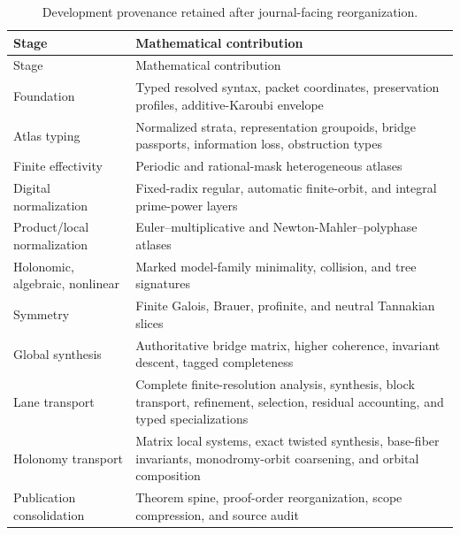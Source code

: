 \begin{longtable}{@{}L{0.27\textwidth}L{0.65\textwidth}@{}}
\caption{Development provenance retained after journal-facing reorganization.}\label{tab:block14-development-ledger}\\
\toprule
Stage & Mathematical contribution \\
\midrule
\endfirsthead
\toprule
Stage & Mathematical contribution \\
\midrule
\endhead
Foundation & Typed resolved syntax, packet coordinates, preservation profiles, additive-Karoubi envelope \\
Atlas typing & Normalized strata, representation groupoids, bridge passports, information loss, obstruction types \\
Finite effectivity & Periodic and rational-mask heterogeneous atlases \\
Digital normalization & Fixed-radix regular, automatic finite-orbit, and integral prime-power layers \\
Product/local normalization & Euler--multiplicative and Newton-Mahler--polyphase atlases \\
Holonomic, algebraic, nonlinear & Marked model-family minimality, collision, and tree signatures \\
Symmetry & Finite Galois, Brauer, profinite, and neutral Tannakian slices \\
Global synthesis & Authoritative bridge matrix, higher coherence, invariant descent, tagged completeness \\
Lane transport & Complete finite-resolution analysis, synthesis, block transport, refinement, selection, residual accounting, and typed specializations \\
Holonomy transport & Matrix local systems, exact twisted synthesis, base-fiber invariants, monodromy-orbit coarsening, and orbital composition \\
Publication consolidation & Theorem spine, proof-order reorganization, scope compression, and source audit \\
\bottomrule
\end{longtable}
